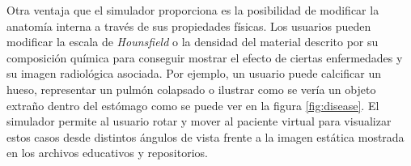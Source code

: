 Otra ventaja que el simulador proporciona es la posibilidad de modificar la anatomía interna a través de sus propiedades físicas. Los usuarios pueden modificar la escala de \emph{Hounsfield} o la densidad del material descrito por su composición química para conseguir mostrar el efecto de ciertas enfermedades y su imagen radiológica asociada. Por ejemplo, un usuario puede calcificar un hueso, representar un pulmón colapsado o ilustrar como se vería un objeto extraño dentro del estómago como se puede ver en la figura \ref{fig:disease}. El simulador permite al usuario rotar y mover al paciente virtual para visualizar estos casos desde distintos ángulos de vista frente a la imagen estática mostrada en los archivos educativos y repositorios.%



